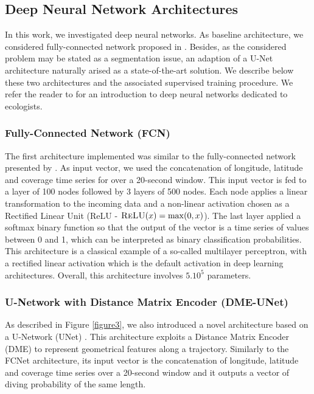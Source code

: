 \documentclass{article}
\begin{document}
\subsection{Deep Neural Network Architectures}

In this work, we investigated deep neural networks. As baseline architecture, we considered fully-connected network proposed in \citep{browning_predicting_2018}. Besides, as the considered problem may be stated as a segmentation issue, an adaption of a U-Net architecture naturally arised as a state-of-the-art solution. We describe below these two architectures and the associated supervised training procedure. We refer the reader to \citep{christin_applications_2019} for an introduction to deep neural networks dedicated to ecologists.

\subsubsection{Fully-Connected Network (FCN)}
The first architecture implemented was similar to the fully-connected network presented by \citep{browning_predicting_2018}. As input vector, we used the concatenation of longitude, latitude and coverage time series for over a 20-second window. This input vector is fed to a layer of 100 nodes followed by 3 layers of 500 nodes. Each node applies a linear transformation to the incoming data and a non-linear activation chosen as a Rectified Linear Unit (ReLU - $\textsc{ReLU}(x) = \max(0,x)$). The last layer applied a softmax binary function so that the output of the vector is a time series of values between  0 and 1, which can be interpreted as binary classification probabilities.
This  architecture is a classical example of a so-called multilayer perceptron, with a rectified linear activation which is the default activation in deep learning architectures. Overall, this architecture involves $5.10^{5}$ parameters.

\subsubsection{U-Network with Distance Matrix Encoder (DME-UNet)}
As described in Figure \ref{figure3}, we also introduced a novel architecture based on a U-Network (UNet)  \citep{ronneberger_u-net_2015}. This architecture exploits a
Distance Matrix Encoder (DME) to represent geometrical features along a trajectory.
Similarly to the FCNet architecture, its input vector is the concatenation of longitude, latitude and coverage time series over a 20-second window and it outputs a vector of diving probability of the same length.
\end{document}
